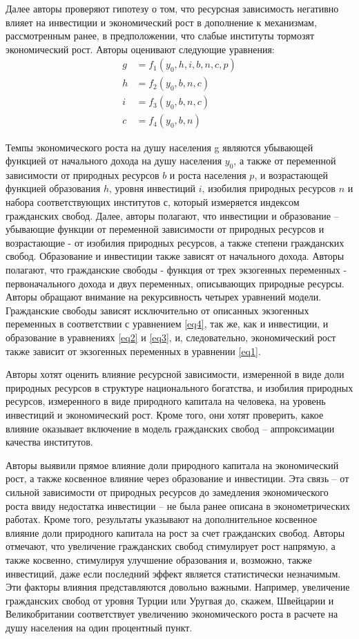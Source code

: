 \documentclass[12pt,a4paper, oneside]{extreport}
\begin{document}
Далее авторы проверяют гипотезу о том, что ресурсная зависимость негативно влияет на инвестиции и экономический рост в дополнение к механизмам, рассмотренным ранее, в предположении, что слабые институты тормозят экономический рост. Авторы оценивают следующие уравнения:
\begin{align} 
	g&=f_1(y_0,h,i,b,n,c,p) \label{eq1} \\
	h&=f_2(y_0,b,n,c) \label{eq2} \\
	i&=f_3(y_0,b,n,c) \label{eq3} \\
	c&=f_4(y_0,b,n) \label{eq4}
\end{align}

Темпы экономического роста на душу населения g являются убывающей функцией от начального дохода на душу населения $y_0$, а также от переменной зависимости от природных ресурсов $b$ и роста населения $p$, и возрастающей функцией образования $h$, уровня инвестиций $i$, изобилия природных ресурсов $n$ и набора соответствующих институтов $с$, который измеряется индексом гражданских свобод. Далее, авторы полагают, что инвестиции и образование – убывающие функции от переменной зависимости от природных ресурсов и возрастающие - от изобилия природных ресурсов, а также степени гражданских свобод. Образование и инвестиции также зависят от начального дохода. Авторы полагают, что гражданские свободы - функция от трех экзогенных переменных - первоначального дохода и двух переменных, описывающих природные ресурсы. Авторы обращают внимание на рекурсивность четырех уравнений модели. Гражданские свободы зависят исключительно от описанных экзогенных переменных в соответствии с уравнением \ref{eq4}, так же, как и инвестиции, и образование в уравнениях \ref{eq2} и \ref{eq3}, и, следовательно, экономический рост также зависит от экзогенных переменных в уравнении \ref{eq1}.

Авторы хотят оценить влияние ресурсной зависимости, измеренной в виде доли природных ресурсов в структуре национального богатства, и изобилия природных ресурсов, измеренного в виде природного капитала на человека, на уровень инвестиций и экономический рост. Кроме того, они хотят проверить, какое влияние оказывает включение в модель гражданских свобод – аппроксимации качества институтов.

Авторы выявили прямое влияние доли природного капитала на экономический рост, а также косвенное влияние через образование и инвестиции. Эта связь – от сильной зависимости от природных ресурсов до замедления экономического роста ввиду недостатка инвестиции – не была ранее описана в эконометрических работах. Кроме того, результаты указывают на дополнительное косвенное влияние доли природного капитала на рост за счет гражданских свобод. Авторы отмечают, что увеличение гражданских свобод стимулирует рост напрямую, а также косвенно, стимулируя улучшение образования и, возможно, также инвестиций, даже если последний эффект является статистически незначимым. Эти факторы влияния представляются довольно важными. Например, увеличение гражданских свобод от уровня Турции или Уругвая до, скажем, Швейцарии и Великобритании соответствует увеличению экономического роста в расчете на душу населения на один процентный пункт.
\end{document}
